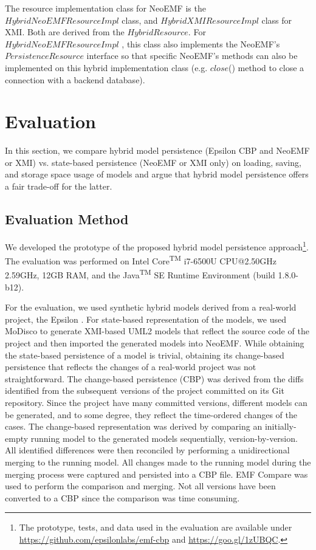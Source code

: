 \documentclass[10pt,conference]{IEEEtran}
\begin{document}
The resource implementation class for NeoEMF is the $HybridNeoEMFResourceImpl$ class, and $HybridXMIResource$$Impl$ class for XMI. Both are derived from the $HybridResource$. For $HybridNeoEMFResourceImpl$ , this class also implements the NeoEMF's $PersistenceResource$ interface \cite{atlanmod2018persistentResource} so that specific NeoEMF's methods can also be implemented on this hybrid implementation class (e.g. $close$() method to close a connection with a backend database). 

\section{Evaluation}
\label{sec:evaluation}

In this section, we compare hybrid model persistence (Epsilon CBP and NeoEMF or XMI) vs. state-based persistence (NeoEMF or XMI only) on loading, saving, and storage space usage of models and argue that hybrid model persistence offers a fair trade-off for the latter. 

\subsection{Evaluation Method}
\label{sec:evaluation_method}
We developed the prototype of the proposed hybrid model persistence approach\footnote{The prototype, tests, and data used in the evaluation are available under \url{https://github.com/epsilonlabs/emf-cbp} and \url{https://goo.gl/1zUBQC}.}. The evaluation was performed on Intel\textsuperscript{\textregistered} Core\textsuperscript{TM} i7-6500U CPU@2.50GHz 2.59GHz, 12GB RAM, and the Java\textsuperscript{TM} SE Runtime Environment (build 1.8.0-b12).

For the evaluation, we used synthetic hybrid models derived from a real-world project, the Epsilon \cite{eclipse2017epsilon,eclipse2018epsilongit}. For state-based representation of the models, we used MoDisco \cite{DBLP:journals/infsof/BruneliereCDM14} to generate XMI-based UML2 \cite{eclipse2017uml2} models that reflect the source code of the project and then imported the generated models into NeoEMF. While obtaining the state-based persistence of a model is trivial, obtaining its change-based persistence that reflects the changes of a real-world project was not straightforward. The change-based persistence (CBP) was derived from the diffs identified from the subsequent versions of the project committed on its Git repository. Since the project have many committed versions, different models can be generated, and to some degree, they reflect the time-ordered changes of the cases. The change-based representation was derived by comparing an initially-empty running model to the generated models sequentially, version-by-version. All identified differences were then reconciled by performing a unidirectional merging to the running model. All changes made to the running model during the merging process were captured and persisted into a CBP file. EMF Compare was used \cite{eclipse2017compare} to perform the comparison and merging. Not all versions have been converted to a CBP since the comparison was time consuming.  
\end{document}
